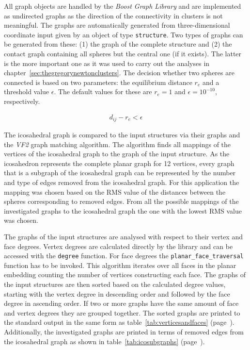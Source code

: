 All graph objects are handled by the \textit{Boost Graph
Library}\autocite{Siek_BoostGraphLibrary_2002} and are implemented as undirected
graphs as the direction of the connectivity in clusters is not meaningful. The
graphs are automatically generated from three-dimensional coordinate input given
by an object of type \verb|structure|. Two types of graphs can be generated from
these: (1) the graph of the complete structure and (2) the contact graph
containing all spheres but the central one (if it exists). The latter is the
more important one as it was used to carry out the analyses in
chapter~\ref{sec:thegregorynewtonclusters}. The decision whether two spheres are
connected is based on two parameters: the equilibrium distance $r_e$ and a
threshold value $\epsilon$. The default values for these are $r_e=1$ and
$\epsilon=10^{-10}$, respectively.

\begin{align}
    d_{ij}-r_e < \epsilon
\end{align}

The icosahedral graph is compared to the input structures via their graphs and
the \textit{VF2} graph matching
algorithm.\autocite{Cordella_ImprovedAlgorithmMatching_2001,Cordella_SubGraphIsomorphism_2004}
The algorithm finds all mappings of the vertices of the icosahedral graph to the
graph of the input structure. As the icosahedron represents the complete planar
graph for 12 vertices, every graph that is a subgraph of the icosahedral graph
can be represented by the number and type of edges removed from the icosahedral
graph. For this application the mapping was chosen based on the \ac{RMS} value
of the distances between the spheres corresponding to removed edges. From all
the possible mappings of the investigated graphs to the icosahedral graph the
one with the lowest \ac{RMS} value was chosen.

The graphs of the input structures are analysed with respect to their vertex
and face degrees. Vertex degrees are calculated directly by the library and can
be accessed with the \verb|degree| function. For face degrees the
\verb|planar_face_traversal| function has to be invoked. This algorithm
iterates over all faces in the planar embedding counting the number of vertices
constructing each face. The graphs of the input structures are then sorted
based on the calculated degree values, starting with the vertex degree in
descending order and followed by the face degree in ascending order. If two or
more graphs have the same amount of face and vertex degrees they are grouped
together. The sorted graphs are printed to the standard output in the same form
as table~\ref{tab:verticesandfaces} (page~\pageref{tab:verticesandfaces}).
Additionally, the investigated graphs are printed in terms of removed edges
from the icosahedral graph as shown in table~\ref{tab:icosubgraphs}
(page~\pageref{tab:icosubgraphs}).


